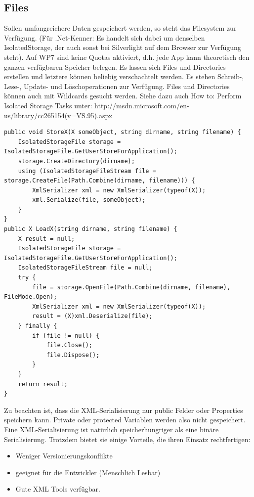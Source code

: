 \documentclass[a4paper,10pt]{scrreprt}
\begin{document}
\subsection{Files}
Sollen umfangreichere Daten gespeichert werden, so steht das Filesystem zur Verfügung. (Für .Net-Kenner: Es
handelt sich dabei um denselben IsolatedStorage, der auch sonst bei Silverlight auf dem Browser zur Verfügung
steht). Auf WP7 sind keine Quotas aktiviert, d.h. jede App kann theoretisch den ganzen verfügbaren Speicher
belegen. Es lassen sich Files und Directories erstellen und letztere können beliebig verschachtelt werden. Es
stehen Schreib-, Lese-, Update- und Löschoperationen zur Verfügung. Files und Directories können auch mit
Wildcards gesucht werden. Siehe dazu auch How to: Perform Isolated Storage Tasks unter:
http://msdn.microsoft.com/en-us/library/cc265154(v=VS.95).aspx

\begin{lstlisting}[caption=File Storage]
public void StoreX(X someObject, string dirname, string filename) {
	IsolatedStorageFile storage = IsolatedStorageFile.GetUserStoreForApplication();
	storage.CreateDirectory(dirname);
	using (IsolatedStorageFileStream file = storage.CreateFile(Path.Combine(dirname, filename))) {
		XmlSerializer xml = new XmlSerializer(typeof(X));
		xml.Serialize(file, someObject);
	}
}
public X LoadX(string dirname, string filename) {
	X result = null;
	IsolatedStorageFile storage = IsolatedStorageFile.GetUserStoreForApplication();
	IsolatedStorageFileStream file = null;
	try {
		file = storage.OpenFile(Path.Combine(dirname, filename), FileMode.Open);
		XmlSerializer xml = new XmlSerializer(typeof(X));
		result = (X)xml.Deserialize(file);
	} finally {
		if (file != null) {
			file.Close();
			file.Dispose();
		}
	}
	return result;
}
\end{lstlisting}
Zu beachten ist, dass die XML-Serialisierung nur public Felder oder Properties speichern kann. Private oder
protected Variablen werden also nicht gespeichert.
Eine XML-Serialisierung ist natürlich speicherhungriger als eine binäre Serialisierung. Trotzdem bietet sie einige
Vorteile, die ihren Einsatz rechtfertigen:
\begin{itemize}
 \item Weniger Versionierungskonflikte
 \item geeignet für die Entwickler (Menschlich Lesbar)
 \item Gute XML Tools verfügbar.
\end{itemize}
\end{document}
